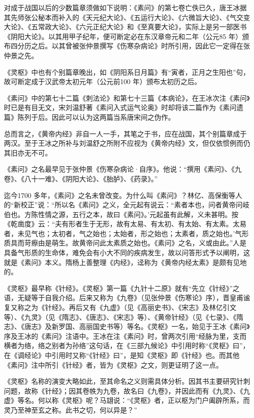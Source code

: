 \documentclass[12pt,UTF8]{ctexbook}
\begin{document}
对成于战国以后的少数篇章须做如下说明：《素问》的第七卷亡佚已久，唐王冰据其先师张公秘本而补入的《天元纪大论》、《五运行大论》、《六微旨大论》、《气交变大论》、《五常政大论》、《六元正纪大论》和《至真要大论》，实际上是另一部医书《阴阳大论》。以其用甲子纪年，便可断定必在东汉章帝元和二年（公元85 年）颁布四分历之后。以其曾被张仲景撰写《伤寒杂病论》时所引用，因此它一定得在张仲景之先。

《灵枢》中也有个别篇章晚出，如《阴阳系日月篇》有“寅者，正月之生阳也”句，故可断定成于汉武帝太初元年（公元前100 年）颁布太初历之后。

《素问》中的第七十二篇《刺法论》和第七十三篇《本病论》，在王冰次注《素问》时已是有目无文，宋刘温舒著《素问入式运气论奥》时却将该二篇作为《素问遗篇》陈列于后。因此可以认为这两篇当系唐宋间之伪作。

总而言之，《黄帝内经》非自一人一手，其笔之于书，应在战国，其个别篇章成于两汉。至于王冰之所补与刘温舒之所附不应视为《黄帝内经》文，但仅依惯例而仍其旧亦无不可。

《素问》之名最早见于张仲景《伤寒杂病论·自序》。他说：“撰用《素问》、《九卷》、《八十一难》、《阴阳大论》、《胎胪》、《药录》。”

迄今1700 多年，《素问》之名未曾改变。为什么叫《素问》？林亿、高保衡等人的“新校正”说：“所以名《素问》之义，全元起有说云：“素者本也，问者黄帝问岐伯也。方陈性情之源，五行之本，故曰《素问》。’元起虽有此解，义未甚明。按《乾凿度》云：“夫有形者生于无形，故有太易、有太初、有太始、有太素。太易者，未见气也；太初者，气之始也；太始者，形之始也；太素者，质之始也。’气形质具而苛瘵由是萌生。故黄帝问此太素质之始也。《素问》之名，义或由此。”人是具备气形质的生命体，难免会有小大不同的疾病发生，故以问答形式予以阐明，这就是《素问》本义。隋杨上善整理《内经》，迳称为《黄帝内经太素》是颇有见地的。

《灵枢》最早称《针经》。《灵枢》第一篇《九针十二原》就有“先立《针经》”之语，无疑等于自我介绍。后来又称为《九卷》（见张仲景《伤寒论》序），晋皇甫谧复又称之为《针经》。再后又有《九虚》（见《高丽史书》、《宋志》及林亿引文等）、《九灵》（见《隋志》、《唐志》、《宋志》等）、《黄帝针经》（见《七录》、《隋志》、《唐志》及新罗国、高丽国史书等）等名。《灵枢》一名，始见于王冰《素问》序及王冰的《素问》注语中。王冰在注《素问》时，曾两次引用“经脉为里，支而横者为络，络之别者为孙络”这句话，在《三部九候论》中引用时称“《灵枢》曰”，在《调经论》中引用时又称“《针经》曰”，是知《灵枢》即《针经》也。而其他《素问》注中所引《针经》者，皆为《灵枢》之文，则更证明了这一点。

《灵枢》名称的演变大略如此，至其命名之义则需具体分析。因其书主要研究针刺问题，故称《针经》；因其卷帙为九卷，故名曰《九卷》，并因此而有《九灵》、《九虚》等名。何以称《灵枢》呢？马翃说：“《灵枢》者，正以枢为门户阖辟所系，而灵乃至神至玄之称。此书之切，何以异是？”
\end{document}
